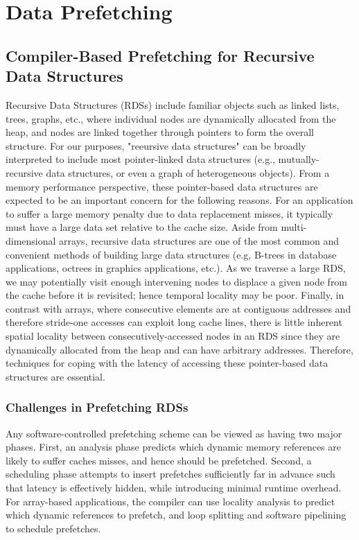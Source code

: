 \newpage

\section{Data Prefetching}
\subsection{Compiler-Based Prefetching for Recursive Data Structures\cite{luk1996compiler}}

Recursive Data Structures (RDSs) include familiar objects
such as linked lists, trees, graphs, etc., where individual nodes
are dynamically allocated from the heap, and nodes are linked
together through pointers to form the overall structure. For
our purposes, "reeursive data structures" can be broadly interpreted to include most pointer-linked data structures (e.g.,
mutually-recursive data structures, or even a graph of heterogeneous objects). From a memory performance perspective, these
pointer-based data structures are expected to be an important
concern for the following reasons. For an application to suffer a large memory penalty due to data replacement misses, it
typically must have a large data set relative to the cache size.
Aside from multi-dimensional arrays, recursive data structures
are one of the most common and convenient methods of building
large data structures (e.g, B-trees in database applications, octrees in graphics applications, etc.). As we traverse a large RDS,
we may potentially visit enough intervening nodes to displace a
given node from the cache before it is revisited; hence temporal
locality may be poor. Finally, in contrast with arrays, where
consecutive elements are at contiguous addresses and therefore
stride-one accesses can exploit long cache lines, there is little inherent spatial locality between consecutively-accessed nodes in
an RDS since they are dynamically allocated from the heap and
can have arbitrary addresses. Therefore, techniques for coping
with the latency of accessing these pointer-based data structures
are essential.



\subsubsection{Challenges in Prefetching RDSs }


Any software-controlled prefetching scheme can be viewed as having two major phases. First, an analysis phase predicts which dynamic memory references are likely to suffer caches misses, and
hence should be prefetched. Second, a scheduling phase attempts
to insert prefetches sufficiently far in advance such that latency is
effectively hidden, while introducing minimal runtime overhead.
For array-based applications, the compiler can use locality analysis to predict which dynamic references to prefetch, and loop
splitting and software pipelining to schedule prefetches.

